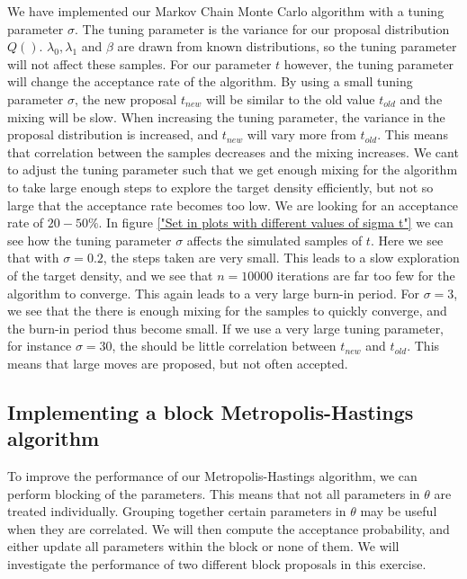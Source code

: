 We have implemented our Markov Chain Monte Carlo algorithm with a tuning parameter $\sigma$. The tuning parameter is the variance for our proposal distribution $Q()$. $\lambda_0, \lambda_1$ and $\beta$ are drawn from known distributions, so the tuning parameter will not affect these samples. For our parameter $t$ however, the tuning parameter will change the acceptance rate of the algorithm. By using a small tuning parameter $\sigma$, the new proposal $t_{new}$ will be similar to the old value $t_{old}$ and the mixing will be slow. When increasing the tuning parameter, the variance in the proposal distribution is increased, and $t_{new}$ will vary more from $t_{old}$. This means that correlation between the samples decreases and the mixing increases. We cant to adjust the tuning parameter such that we get enough mixing for the algorithm to take large enough steps to explore the target density efficiently, but not so large that the acceptance rate becomes too low. We are looking for an acceptance rate of $20 - 50\%$. In figure \ref{"Set in plots with different values of sigma t"} we can see how the tuning parameter $\sigma$ affects the simulated samples of $t$.  Here we see that with $\sigma = 0.2$, the steps taken are very small. This leads to a slow exploration of the target density, and we see that $n = 10000$ iterations are far too few for the algorithm to converge. This again leads to a very large burn-in period. For $\sigma = 3$, we see that the there is enough mixing for the samples to quickly converge, and the burn-in period thus become small. If we use a very large tuning parameter, for instance $\sigma = 30$, the should be little correlation between $t_{new}$ and $t_{old}$. This means that large moves are proposed, but not often accepted. 




\subsection{Implementing a block Metropolis-Hastings algorithm}

To improve the performance of our Metropolis-Hastings algorithm, we can perform blocking of the parameters. This means that not all parameters in $\theta$ are treated individually. Grouping together certain parameters in $\theta$ may be useful when they are correlated. We will then compute the acceptance probability, and either update all parameters within the block or none of them. We will investigate the performance of two different block proposals in this exercise. 

